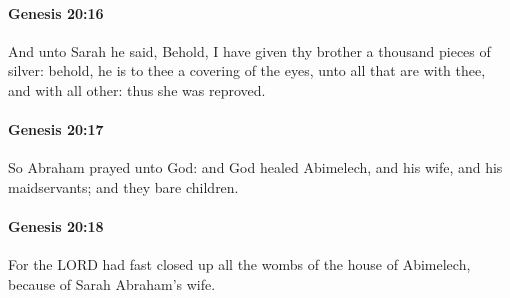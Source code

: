		\paragraph{Genesis 20:16} %
			\label{GENESIS-20-16}

			And unto Sarah he said, Behold, I have given thy brother a thousand pieces of silver: behold, he is to thee a covering of the eyes, unto all that are with thee, and with all other: thus she was reproved.


		\paragraph{Genesis 20:17} %
			\label{GENESIS-20-17}

			So Abraham prayed unto God: and God healed Abimelech, and his wife, and his maidservants; and they bare children.


		\paragraph{Genesis 20:18} %
			\label{GENESIS-20-18}

			For the LORD had fast closed up all the wombs of the house of Abimelech, because of Sarah Abraham's wife.


